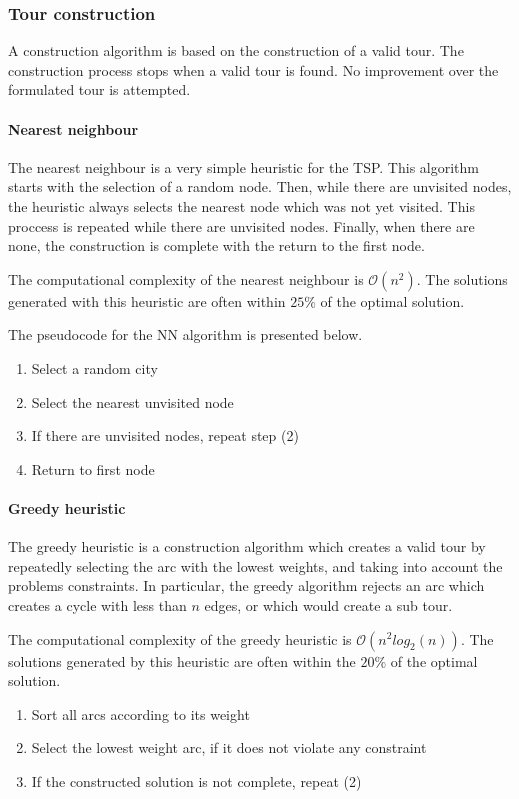 \subsubsection{Tour construction}


A construction algorithm is based on the construction of a valid tour.
The construction process stops when a valid tour is found. No improvement
over the formulated tour is attempted.

\paragraph{Nearest neighbour}
The nearest neighbour is a very simple heuristic for the TSP. This algorithm
starts with the selection of a random node. Then, while there are unvisited nodes,
the heuristic always selects the nearest node which was not yet visited.
This proccess is repeated while there are unvisited nodes. Finally, when there
are none, the construction is complete with the return to the first node.

The computational complexity of the nearest neighbour is $\mathcal{O}(n^2)$.
The solutions generated with this heuristic are often within $25\%$ of the
optimal solution.

The pseudocode for the NN algorithm is presented below.

\begin{enumerate}
  \item Select a random city
  \item Select the nearest unvisited node
  \item If there are unvisited nodes, repeat step (2)
  \item Return to first node
\end{enumerate}


\paragraph{Greedy heuristic}
The greedy heuristic is a construction algorithm which creates a valid tour
by repeatedly selecting the arc with the lowest weights, and taking into account
the problems constraints. In particular, the greedy algorithm rejects an arc
which creates a cycle with less than $n$ edges, or which would create a sub tour.

The computational complexity of the greedy heuristic is $\mathcal{O}(n^2log_2(n))$.
The solutions generated by this heuristic are often within the $20\%$ of the
optimal solution.

\begin{enumerate}
  \item Sort all arcs according to its weight
  \item Select the lowest weight arc, if it does not violate any constraint
  \item If the constructed solution is not complete, repeat (2)
\end{enumerate}
